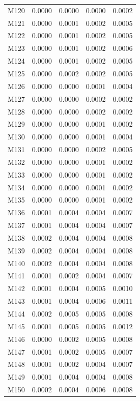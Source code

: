 \begin{longtable}{lrrrr}
M120 & 0.0000 & 0.0000 & 0.0000 & 0.0002 \\
M121 & 0.0000 & 0.0001 & 0.0002 & 0.0005 \\
M122 & 0.0000 & 0.0001 & 0.0002 & 0.0005 \\
M123 & 0.0000 & 0.0001 & 0.0002 & 0.0006 \\
M124 & 0.0000 & 0.0001 & 0.0002 & 0.0005 \\
M125 & 0.0000 & 0.0002 & 0.0002 & 0.0005 \\
M126 & 0.0000 & 0.0000 & 0.0001 & 0.0004 \\
M127 & 0.0000 & 0.0000 & 0.0002 & 0.0002 \\
M128 & 0.0000 & 0.0000 & 0.0002 & 0.0002 \\
M129 & 0.0000 & 0.0000 & 0.0001 & 0.0002 \\
M130 & 0.0000 & 0.0000 & 0.0001 & 0.0004 \\
M131 & 0.0000 & 0.0000 & 0.0002 & 0.0005 \\
M132 & 0.0000 & 0.0000 & 0.0001 & 0.0002 \\
M133 & 0.0000 & 0.0000 & 0.0001 & 0.0002 \\
M134 & 0.0000 & 0.0000 & 0.0001 & 0.0002 \\
M135 & 0.0000 & 0.0000 & 0.0001 & 0.0002 \\
M136 & 0.0001 & 0.0004 & 0.0004 & 0.0007 \\
M137 & 0.0001 & 0.0004 & 0.0004 & 0.0007 \\
M138 & 0.0002 & 0.0004 & 0.0004 & 0.0008 \\
M139 & 0.0002 & 0.0004 & 0.0004 & 0.0008 \\
M140 & 0.0002 & 0.0004 & 0.0004 & 0.0008 \\
M141 & 0.0001 & 0.0002 & 0.0004 & 0.0007 \\
M142 & 0.0001 & 0.0004 & 0.0005 & 0.0010 \\
M143 & 0.0001 & 0.0004 & 0.0006 & 0.0011 \\
M144 & 0.0002 & 0.0005 & 0.0005 & 0.0008 \\
M145 & 0.0001 & 0.0005 & 0.0005 & 0.0012 \\
M146 & 0.0000 & 0.0002 & 0.0005 & 0.0008 \\
M147 & 0.0001 & 0.0002 & 0.0005 & 0.0007 \\
M148 & 0.0001 & 0.0002 & 0.0004 & 0.0007 \\
M149 & 0.0001 & 0.0004 & 0.0004 & 0.0008 \\
M150 & 0.0002 & 0.0004 & 0.0006 & 0.0008 \\

\end{longtable}
